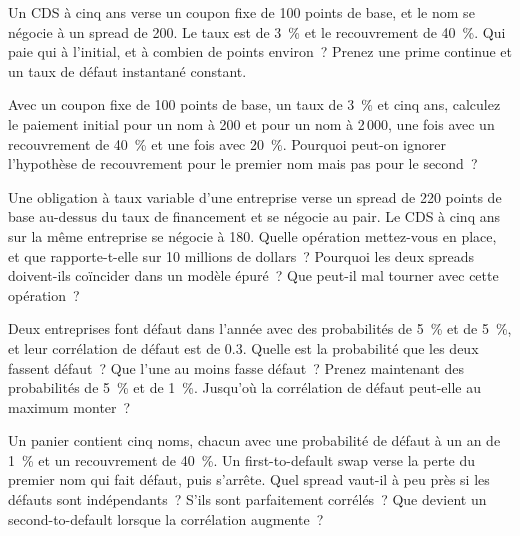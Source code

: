 \begin{question}\label{iq:iv2:credit-and-xva:5}
Un CDS à cinq ans verse un coupon fixe de 100 points de base, et le nom se négocie à un spread de 200. Le taux est de 3~\% et le recouvrement de 40~\%. Qui paie qui à l'initial, et à combien de points environ~? Prenez une prime continue et un taux de défaut instantané constant.
\end{question}

\begin{question}\label{iq:iv2:credit-and-xva:6}
Avec un coupon fixe de 100 points de base, un taux de 3~\% et cinq ans, calculez le paiement initial pour un nom à 200 et pour un nom à 2\,000, une fois avec un recouvrement de 40~\% et une fois avec 20~\%. Pourquoi peut-on ignorer l'hypothèse de recouvrement pour le premier nom mais pas pour le second~?
\end{question}

\begin{question}\label{iq:iv2:credit-and-xva:7}
Une obligation à taux variable d'une entreprise verse un spread de 220 points de base au-dessus du taux de financement et se négocie au pair. Le CDS à cinq ans sur la même entreprise se négocie à 180. Quelle opération mettez-vous en place, et que rapporte-t-elle sur 10 millions de dollars~? Pourquoi les deux spreads doivent-ils coïncider dans un modèle épuré~? Que peut-il mal tourner avec cette opération~?
\end{question}

\begin{question}\label{iq:iv2:credit-and-xva:8}
Deux entreprises font défaut dans l'année avec des probabilités de 5~\% et de 5~\%, et leur corrélation de défaut est de 0.3. Quelle est la probabilité que les deux fassent défaut~? Que l'une au moins fasse défaut~? Prenez maintenant des probabilités de 5~\% et de 1~\%. Jusqu'où la corrélation de défaut peut-elle au maximum monter~?
\end{question}

\begin{question}\label{iq:iv2:credit-and-xva:9}
Un panier contient cinq noms, chacun avec une probabilité de défaut à un an de 1~\% et un recouvrement de 40~\%. Un first-to-default swap verse la perte du premier nom qui fait défaut, puis s'arrête. Quel spread vaut-il à peu près si les défauts sont indépendants~? S'ils sont parfaitement corrélés~? Que devient un second-to-default lorsque la corrélation augmente~?
\end{question}


